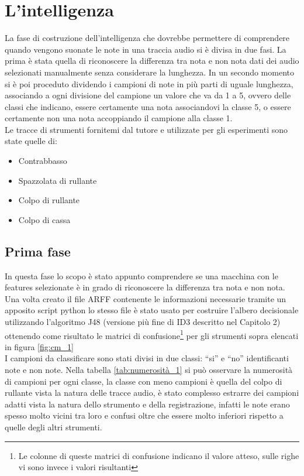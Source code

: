 \chapter{L'intelligenza}
La fase di costruzione dell'intelligenza che dovrebbe permettere di comprendere quando vengono suonate le note in una traccia audio si è divisa in due fasi. La prima è stata quella di riconoscere la differenza tra nota e non nota dati dei audio selezionati manualmente senza considerare la lunghezza. In un secondo momento si è poi proceduto dividendo i campioni di note in più parti di uguale lunghezza, associando a ogni divisione del campione un valore che va da 1 a 5, ovvero delle classi che indicano, essere certamente una nota associandovi la classe 5, o essere certamente non una nota accoppiando il campione alla classe 1.\\
Le tracce di strumenti fornitemi dal tutore e utilizzate per gli esperimenti sono state quelle di: 
\begin{itemize}
	\item Contrabbasso
	\item Spazzolata di rullante
	\item Colpo di rullante
	\item Colpo di cassa
\end{itemize}


\section{Prima fase}
In questa fase lo scopo è stato appunto comprendere se una macchina con le features selezionate è in grado di riconoscere la differenza tra nota e non nota. Una volta creato il file ARFF contenente le informazioni necessarie tramite un apposito script python lo stesso file è stato usato per costruire l'albero decisionale utilizzando l'algoritmo J48 (versione più fine di ID3 descritto nel Capitolo 2) ottenendo come risultato le matrici di confusione\footnote{Le colonne di queste matrici di confusione indicano il valore atteso, sulle righe vi sono invece i valori risultanti} per gli strumenti sopra elencati in figura \ref{fig:cm_1}\\

I campioni da classificare sono stati divisi in due classi: ``si'' e ``no'' identificanti note e non note. Nella tabella \ref{tab:numerosità_1} si può osservare la numerosità di campioni per ogni classe, la classe con meno campioni è quella del colpo di rullante vista la natura delle tracce audio, è stato complesso estrarre dei campioni adatti vista la natura dello strumento e della registrazione, infatti le note erano spesso molto vicini tra loro e confusi oltre che essere molto inferiori rispetto a quelle degli altri strumenti.


